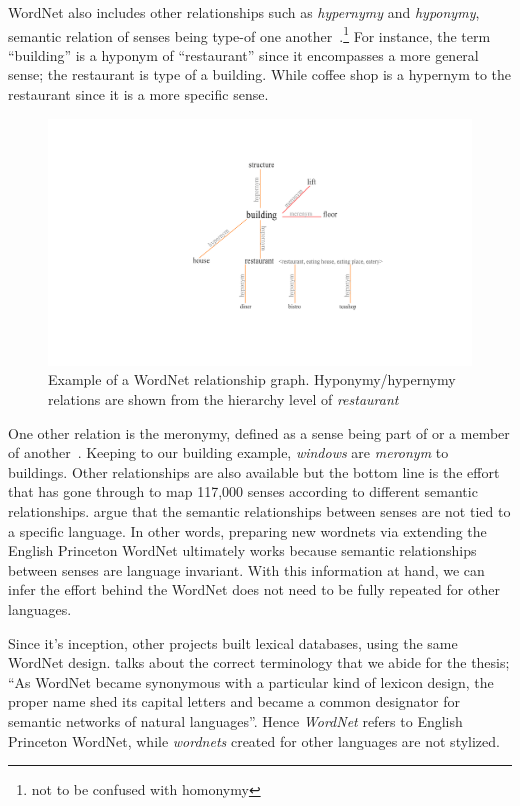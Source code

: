 WordNet also includes other relationships such as \emph{hypernymy} and \emph{hyponymy}, semantic relation of senses being type-of one another~\cite{miller_nouns_1990}.\footnote{not to be confused with homonymy}
For instance, the term \enquote{building} is a hyponym of \enquote{restaurant} since it encompasses a more general sense; the restaurant is type of a building.
While coffee shop is a hypernym to the restaurant since it is a more specific sense.

\begin{figure}[htbp]
    \centering
    \includegraphics[page=1,width=\textwidth]{Figures/hyponym_hypernym.pdf}
    \caption{Example of a WordNet relationship graph. Hyponymy/hypernymy relations are shown from the hierarchy level of \emph{restaurant}}%
    \label{fig:hyponymy}
\end{figure}

One other relation is the meronymy, defined as a sense being part of or a member of another~\cite{winston_taxonomy_1987}.
Keeping to our building example, \emph{windows} are \emph{meronym} to buildings.
Other relationships are also available but the bottom line is the effort that has gone through to map 117,000 senses according to different semantic relationships.
\textcite{sagot_building_2008} argue that the semantic relationships between senses are not tied to a specific language.
In other words, preparing new wordnets via extending the English Princeton WordNet ultimately works because semantic relationships between senses are language invariant.
With this information at hand, we can infer the effort behind the WordNet does not need to be fully repeated for other languages.

Since it's inception, other projects built lexical databases, using the same WordNet design.
\textcite{fellbaum_semantic_1998} talks about the correct terminology that we abide for the thesis; \enquote{As WordNet became synonymous with a particular kind of lexicon design, the proper name shed its capital letters and became a common designator for semantic networks of natural languages}.
Hence \emph{WordNet} refers to English Princeton WordNet, while \emph{wordnets} created for other languages are not stylized.

